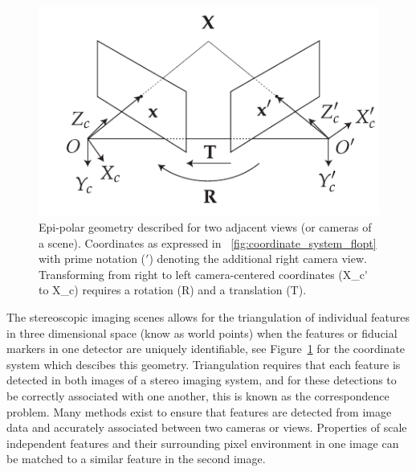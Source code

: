 \documentclass{osa-article}
\begin{document}
\begin{figure}
  \centering
  \includegraphics{./figures/epi-polar-geom}
  \caption[Epi-polar geometry described for two adjacent views]{
  Epi-polar geometry described for two adjacent views (or cameras of a scene).
  Coordinates as expressed in \figurename~\ref{fig:coordinate_system_flopt} with prime notation (\('\)) denoting the additional right camera view.
  Transforming from right to left camera-centered coordinates (\gls{X_c'} to \gls{X_c}) requires a rotation (\gls{R}) and a translation (\gls{T}).
  }\label{fig:epi-polar-geom}
\end{figure}





The stereoscopic imaging scenes allows for the triangulation of individual features in three dimensional space (know as world points) when the features or fiducial markers in one detector are uniquely identifiable, see Figure~\ref{fig:epi-polar-geom} for the coordinate system which descibes this geometry. %
Triangulation requires that each feature is detected in both images of a stereo imaging system, and for these detections to be correctly associated with one another, this is known as the correspondence problem.
Many methods exist to ensure that features are detected from image data and accurately associated between two cameras or views.
Properties of scale independent features and their surrounding pixel environment in one image can be matched to a similar feature in the second image.
\end{document}
